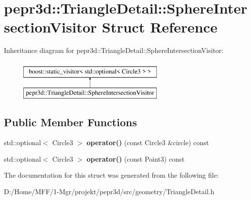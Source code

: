 \hypertarget{structpepr3d_1_1_triangle_detail_1_1_sphere_intersection_visitor}{}\section{pepr3d\+::Triangle\+Detail\+::Sphere\+Intersection\+Visitor Struct Reference}
\label{structpepr3d_1_1_triangle_detail_1_1_sphere_intersection_visitor}
Inheritance diagram for pepr3d\+::Triangle\+Detail\+::Sphere\+Intersection\+Visitor\+:\begin{figure}[H]
\begin{center}
\leavevmode
\includegraphics[height=2.000000cm]{structpepr3d_1_1_triangle_detail_1_1_sphere_intersection_visitor}
\end{center}
\end{figure}
\subsection*{Public Member Functions}
\begin{DoxyCompactItemize}
\item 
\mbox{\label{structpepr3d_1_1_triangle_detail_1_1_sphere_intersection_visitor_afd18b1595c9889ade7f51ab5e209cbf2}} 
std\+::optional$<$ Circle3 $>$ {\bfseries operator()} (const Circle3 \&circle) const
\item 
\mbox{\label{structpepr3d_1_1_triangle_detail_1_1_sphere_intersection_visitor_a923d681e308fc64b6f150748e571ccdb}} 
std\+::optional$<$ Circle3 $>$ {\bfseries operator()} (const Point3) const
\end{DoxyCompactItemize}


The documentation for this struct was generated from the following file\+:\begin{DoxyCompactItemize}
\item 
D\+:/\+Home/\+M\+F\+F/1-\/\+Mgr/projekt/pepr3d/src/geometry/Triangle\+Detail.\+h\end{DoxyCompactItemize}

